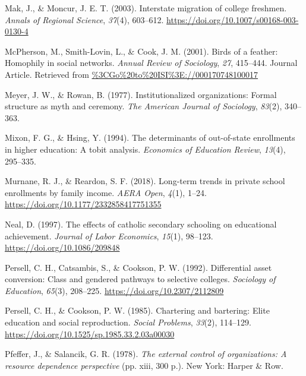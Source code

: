 \documentclass[
  12pt,
]{article}
\newlength{\cslhangindent}
\newlength{\cslentryspacingunit} %
\newenvironment{CSLReferences}[2] %
 {%
  \setlength{\parindent}{0pt}
  \ifodd #1
  \let\oldpar\par
  \def\par{\hangindent=\cslhangindent\oldpar}
  \fi
  \setlength{\parskip}{#2\cslentryspacingunit}
 }%
 {}
\begin{document}
\begin{CSLReferences}{1}{0}
\leavevmode{}%
Mak, J., \& Moncur, J. E. T. (2003). Interstate migration of college freshmen. \emph{Annals of Regional Science}, \emph{37}(4), 603--612. \url{https://doi.org/10.1007/s00168-003-0130-4}

\leavevmode{}%
McPherson, M., Smith-Lovin, L., \& Cook, J. M. (2001). Birds of a feather: Homophily in social networks. \emph{Annual Review of Sociology}, \emph{27}, 415--444. Journal Article. Retrieved from \url{\%3CGo\%20to\%20ISI\%3E://000170748100017}

\leavevmode{}%
Meyer, J. W., \& Rowan, B. (1977). Institutionalized organizations: Formal structure as myth and ceremony. \emph{The American Journal of Sociology}, \emph{83}(2), 340--363.

\leavevmode{}%
Mixon, F. G., \& Hsing, Y. (1994). The determinants of out-of-state enrollments in higher education: A tobit analysis. \emph{Economics of Education Review}, \emph{13}(4), 295--335.

\leavevmode{}%
Murnane, R. J., \& Reardon, S. F. (2018). Long-term trends in private school enrollments by family income. \emph{AERA Open}, \emph{4}(1), 1--24. \url{https://doi.org/10.1177/2332858417751355}

\leavevmode{}%
Neal, D. (1997). The effects of catholic secondary schooling on educational achievement. \emph{Journal of Labor Economics}, \emph{15}(1), 98--123. \url{https://doi.org/10.1086/209848}

\leavevmode{}%
Persell, C. H., Catsambis, S., \& Cookson, P. W. (1992). Differential asset conversion: Class and gendered pathways to selective colleges. \emph{Sociology of Education}, \emph{65}(3), 208--225. \url{https://doi.org/10.2307/2112809}

\leavevmode{}%
Persell, C. H., \& Cookson, P. W. (1985). Chartering and bartering: Elite education and social reproduction. \emph{Social Problems}, \emph{33}(2), 114--129. \url{https://doi.org/10.1525/sp.1985.33.2.03a00030}

\leavevmode{}%
Pfeffer, J., \& Salancik, G. R. (1978). \emph{The external control of organizations: A resource dependence perspective} (pp. xiii, 300 p.). New York: Harper \& Row.


\end{CSLReferences}
\end{document}
